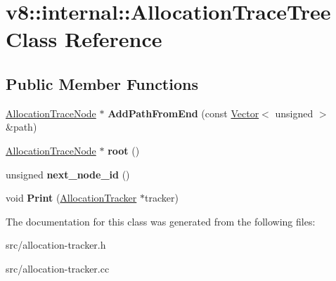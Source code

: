 \hypertarget{classv8_1_1internal_1_1_allocation_trace_tree}{}\section{v8\+:\+:internal\+:\+:Allocation\+Trace\+Tree Class Reference}
\label{classv8_1_1internal_1_1_allocation_trace_tree}
\subsection*{Public Member Functions}
\begin{DoxyCompactItemize}
\item 
\hypertarget{classv8_1_1internal_1_1_allocation_trace_tree_ac5d8e76d5c1250e5a0c0453d79fc656e}{}\hyperlink{classv8_1_1internal_1_1_allocation_trace_node}{Allocation\+Trace\+Node} $\ast$ {\bfseries Add\+Path\+From\+End} (const \hyperlink{classv8_1_1internal_1_1_vector}{Vector}$<$ unsigned $>$ \&path)\label{classv8_1_1internal_1_1_allocation_trace_tree_ac5d8e76d5c1250e5a0c0453d79fc656e}

\item 
\hypertarget{classv8_1_1internal_1_1_allocation_trace_tree_af36cd4ae9797ba6e8681349f3db7d0b0}{}\hyperlink{classv8_1_1internal_1_1_allocation_trace_node}{Allocation\+Trace\+Node} $\ast$ {\bfseries root} ()\label{classv8_1_1internal_1_1_allocation_trace_tree_af36cd4ae9797ba6e8681349f3db7d0b0}

\item 
\hypertarget{classv8_1_1internal_1_1_allocation_trace_tree_aed92bbd12c4ca3ea8dfabf9f3ce16d9e}{}unsigned {\bfseries next\+\_\+node\+\_\+id} ()\label{classv8_1_1internal_1_1_allocation_trace_tree_aed92bbd12c4ca3ea8dfabf9f3ce16d9e}

\item 
\hypertarget{classv8_1_1internal_1_1_allocation_trace_tree_a37ac3b1e978232c6150a1d3edf4da9ce}{}void {\bfseries Print} (\hyperlink{classv8_1_1internal_1_1_allocation_tracker}{Allocation\+Tracker} $\ast$tracker)\label{classv8_1_1internal_1_1_allocation_trace_tree_a37ac3b1e978232c6150a1d3edf4da9ce}

\end{DoxyCompactItemize}


The documentation for this class was generated from the following files\+:\begin{DoxyCompactItemize}
\item 
src/allocation-\/tracker.\+h\item 
src/allocation-\/tracker.\+cc\end{DoxyCompactItemize}
